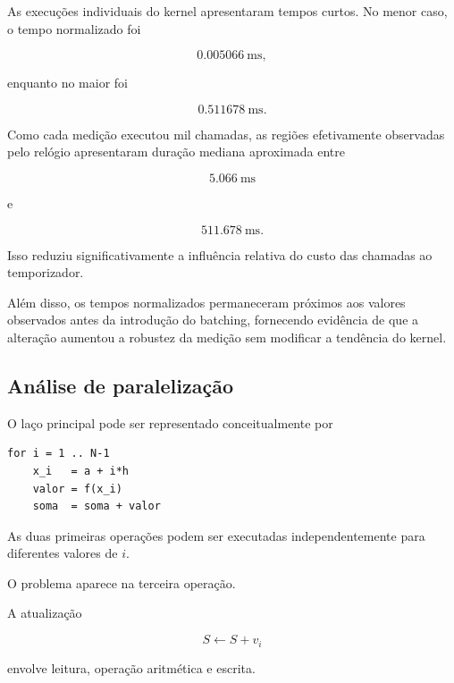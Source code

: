 As execuções individuais do kernel apresentaram tempos curtos. No menor
caso, o tempo normalizado foi

\begin{equation}
    0.005066\ \text{ms},
\end{equation}

enquanto no maior foi

\begin{equation}
    0.511678\ \text{ms}.
\end{equation}

Como cada medição executou mil chamadas, as regiões efetivamente observadas
pelo relógio apresentaram duração mediana aproximada entre

\begin{equation}
    5.066\ \text{ms}
\end{equation}

e

\begin{equation}
    511.678\ \text{ms}.
\end{equation}

Isso reduziu significativamente a influência relativa do custo das chamadas
ao temporizador.

Além disso, os tempos normalizados permaneceram próximos aos valores
observados antes da introdução do batching, fornecendo evidência de que a
alteração aumentou a robustez da medição sem modificar a tendência do
kernel.

\subsection{Análise de paralelização}

O laço principal pode ser representado conceitualmente por

\begin{verbatim}
for i = 1 .. N-1
    x_i   = a + i*h
    valor = f(x_i)
    soma  = soma + valor
\end{verbatim}

As duas primeiras operações podem ser executadas independentemente para
diferentes valores de \(i\).

O problema aparece na terceira operação.

A atualização

\begin{equation}
    S \leftarrow S + v_i
\end{equation}

envolve leitura, operação aritmética e escrita.

